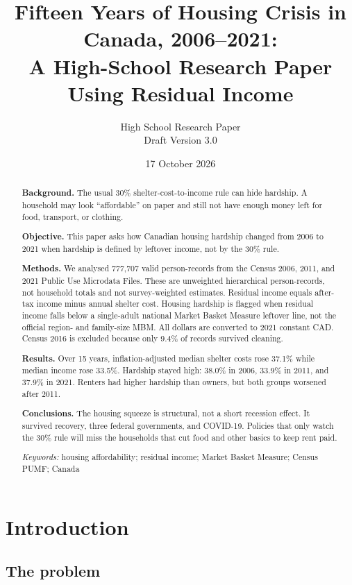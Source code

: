 \documentclass[11pt,letterpaper]{article}
\title{\textbf{Fifteen Years of Housing Crisis in Canada, 2006--2021:\\
A High-School Research Paper Using Residual Income}}
\author{High School Research Paper\\[0.4em]
\large Draft Version 3.0}
\date{17 October 2026}
\begin{document}
\maketitle

\begin{abstract}
\noindent\textbf{Background.}
The usual 30\% shelter-cost-to-income rule can hide hardship.
A household may look ``affordable'' on paper and still not have enough money left for food, transport, or clothing.

\noindent\textbf{Objective.}
This paper asks how Canadian housing hardship changed from 2006 to 2021 when hardship is defined by leftover income, not by the 30\% rule.

\noindent\textbf{Methods.}
We analysed 777,707 valid person-records from the Census 2006, 2011, and 2021 Public Use Microdata Files.
These are unweighted hierarchical person-records, not household totals and not survey-weighted estimates.
Residual income equals after-tax income minus annual shelter cost.
Housing hardship is flagged when residual income falls below a single-adult national Market Basket Measure leftover line, not the official region- and family-size MBM.
All dollars are converted to 2021 constant CAD.
Census 2016 is excluded because only 9.4\% of records survived cleaning.

\noindent\textbf{Results.}
Over 15 years, inflation-adjusted median shelter costs rose 37.1\% while median income rose 33.5\%.
Hardship stayed high: 38.0\% in 2006, 33.9\% in 2011, and 37.9\% in 2021.
Renters had higher hardship than owners, but both groups worsened after 2011.

\noindent\textbf{Conclusions.}
The housing squeeze is structural, not a short recession effect.
It survived recovery, three federal governments, and COVID-19.
Policies that only watch the 30\% rule will miss the households that cut food and other basics to keep rent paid.

\medskip
\noindent\textit{Keywords:} housing affordability; residual income; Market Basket Measure; Census PUMF; Canada
\end{abstract}

\tableofcontents
\newpage

\section{Introduction}
\label{sec:intro}

\subsection{The problem}
\label{sec:problem}
\end{document}
